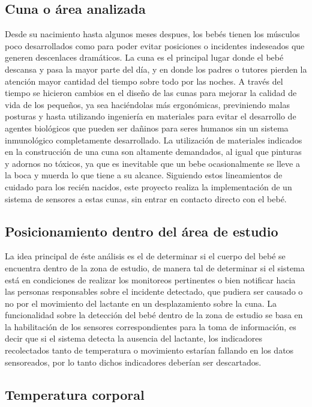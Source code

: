 \documentclass{IEEEtran}
\begin{document}
		\subsection{Cuna o área analizada}

		Desde su nacimiento hasta algunos meses despues, los bebés tienen los músculos poco desarrollados como para poder evitar posiciones o incidentes indeseados que generen descenlaces dramáticos. La cuna es el principal lugar donde el bebé descansa y pasa la mayor parte del día, y en donde los padres o tutores pierden la atención mayor cantidad del tiempo sobre todo por las noches. A través del tiempo se hicieron cambios en el diseño de las cunas para mejorar la calidad de vida de los pequeños, ya sea haciéndolas más ergonómicas, previniendo malas posturas y hasta utilizando ingeniería en materiales para evitar el desarrollo de agentes biológicos que pueden ser dañinos para seres humanos sin un sistema inmunológico completamente desarrollado. La utilización de materiales indicados en la construcción de una cuna son altamente demandados, al igual que pinturas y adornos no tóxicos, ya que es inevitable que un bebe ocasionalmente se lleve a la boca y muerda lo que tiene a su alcance. Siguiendo estos lineamientos de cuidado para los recién nacidos, este proyecto realiza la implementación de un sistema de sensores a estas cunas, sin entrar en contacto directo con el bebé.
		
		\subsection{Posicionamiento dentro del área de estudio}

		La idea principal de éste análisis es el de determinar si el cuerpo del bebé se encuentra dentro de la zona de estudio, de manera tal de determinar si el sistema está en condiciones de realizar los monitoreos pertinentes o bien notificar hacia las personas responsables sobre el incidente detectado, que pudiera ser causado o no por el movimiento del lactante en un desplazamiento sobre la cuna. La funcionalidad sobre la detección del bebé dentro de la zona de estudio se basa en la habilitación de los sensores correspondientes para la toma de información, es decir que si el sistema detecta la ausencia del lactante, los indicadores recolectados tanto de temperatura o movimiento estarían fallando en los datos sensoreados, por lo tanto dichos indicadores deberían ser descartados.
		
		\subsection{Temperatura corporal}
\end{document}
